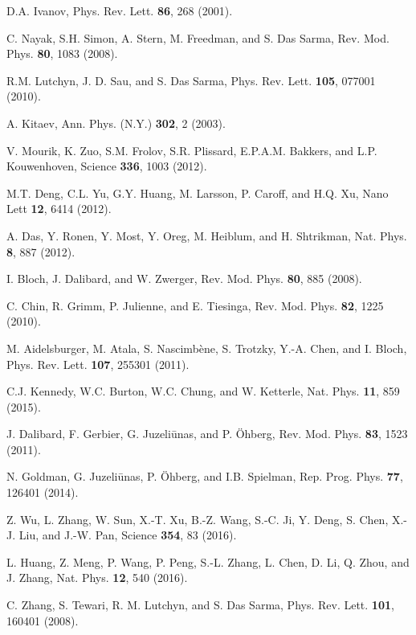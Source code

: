\documentclass[twocolumn,prl,superscriptaddress,amsmath,amssymb]{revtex4} %
\begin{document}
\begin{thebibliography}{10}

 D.A. Ivanov, Phys. Rev. Lett. {\bf 86}, 268 (2001).

 C. Nayak, S.H. Simon, A. Stern, M. Freedman, and  S. Das Sarma, Rev. Mod. Phys. {\bf80}, 1083 (2008).

 R.M. Lutchyn, J. D. Sau, and S. Das Sarma, Phys. Rev. Lett. {\bf 105}, 077001 (2010).

 A. Kitaev, Ann. Phys. (N.Y.) {\bf 302}, 2 (2003).

 V. Mourik, K. Zuo, S.M. Frolov, S.R. Plissard, E.P.A.M. Bakkers, and L.P. Kouwenhoven, Science {\bf 336}, 1003 (2012).

 M.T. Deng, C.L. Yu, G.Y. Huang, M. Larsson, P. Caroff, and H.Q. Xu, Nano Lett {\bf 12}, 6414 (2012).

 A. Das, Y. Ronen, Y. Most, Y. Oreg, M. Heiblum, and H. Shtrikman, Nat. Phys. {\bf 8}, 887 (2012).

 I. Bloch, J. Dalibard, and W. Zwerger, Rev. Mod. Phys. \textbf{80}, 885 (2008).

 C. Chin, R. Grimm, P. Julienne, and E. Tiesinga, Rev. Mod. Phys. \textbf{82}, 1225 (2010).

 M. Aidelsburger, M. Atala, S. Nascimb\`{e}ne, S. Trotzky, Y.-A. Chen, and I. Bloch, Phys. Rev. Lett. {\bf107}, 255301 (2011).

 C.J. Kennedy, W.C. Burton, W.C. Chung, and W. Ketterle, Nat. Phys. {\bf 11}, 859 (2015).

 J. Dalibard, F. Gerbier, G. Juzeli\={u}nas, and P. \"{O}hberg, Rev. Mod. Phys. {\bf83}, 1523 (2011).

 N. Goldman, G. Juzeli\={u}nas, P. \"{O}hberg, and I.B. Spielman, Rep. Prog. Phys. {\bf77}, 126401 (2014).

 Z. Wu, L. Zhang, W. Sun, X.-T. Xu, B.-Z. Wang, S.-C. Ji, Y. Deng, S. Chen, X.-J. Liu, and J.-W. Pan, Science {\bf 354}, 83 (2016).

 L. Huang, Z. Meng, P. Wang, P. Peng, S.-L. Zhang, L. Chen, D. Li, Q. Zhou, and J. Zhang, Nat. Phys. {\bf12}, 540 (2016).

 C. Zhang, S. Tewari, R. M. Lutchyn, and S. Das Sarma, Phys. Rev. Lett. {\bf 101}, 160401 (2008).


\end{thebibliography}
\end{document}
